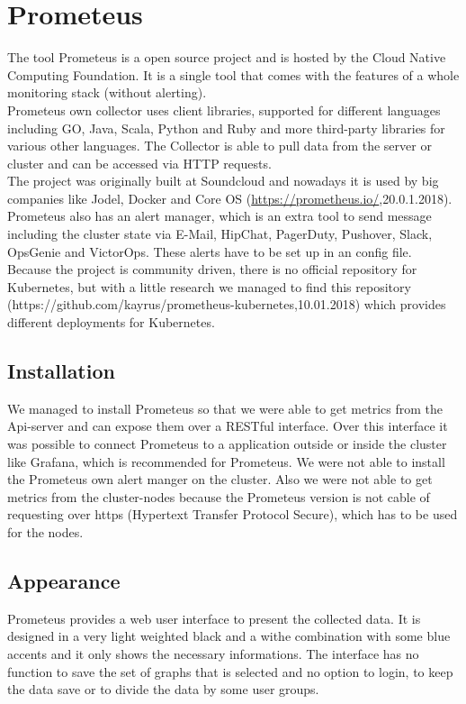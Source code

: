 \section{Prometeus}
\label{Prometeus} %
The tool Prometeus is a open source project and is hosted by the Cloud Native Computing Foundation.
It is a single tool that comes with the features of a whole monitoring stack (without alerting).\\ Prometeus own collector uses client libraries, supported for different languages including GO, Java, Scala, Python and Ruby and more third-party libraries for various other languages. The Collector is able to pull data from the server or cluster and can be accessed via HTTP requests.\\
The project was originally built at Soundcloud and nowadays it is used by big companies like Jodel, Docker and Core OS (\url{https://prometheus.io/},20.0.1.2018). \\
Prometeus also has an alert manager, which is an extra tool to send message including the cluster state via E-Mail, HipChat, PagerDuty, Pushover, Slack, OpsGenie and VictorOps. These alerts have to be set up in an config file. \\
Because the project is community driven, there is no official repository for Kubernetes, but with a little research we managed to find this repository (https://github.com/kayrus/prometheus-kubernetes,10.01.2018) which provides different deployments for Kubernetes.

\subsection{Installation}
We managed to install Prometeus so that we were able to get metrics from the Api-server and can expose them over a RESTful interface. Over this interface it was possible to connect Prometeus to a application outside or inside the cluster like Grafana, which is recommended for Prometeus. We were not able to install the Prometeus own alert manger on the cluster. Also we were not able to get metrics from the cluster-nodes because the Prometeus version is not cable of requesting over https (Hypertext Transfer Protocol Secure), which has to be used for the nodes. 
\subsection{Appearance}%
Prometeus provides a web user interface to present the collected data. It is designed in a very light weighted black and a withe combination with some blue accents and it only shows the necessary informations. The interface has no function to save the set of graphs that is selected and no option to login, to keep the data save or to divide the data by some user groups.   
